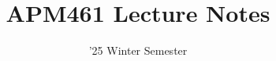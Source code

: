 \documentclass[11pt]{scrartcl}
\begin{document}
\title{APM461 Lecture Notes}
\date{'25 Winter Semester} %
\maketitle

\setcounter{tocdepth}{1}
\tableofcontents
\newpage

 \newpage \setcounter{section}{6}
 \newpage \setcounter{section}{9}
 \newpage \setcounter{section}{11}

\end{document}
